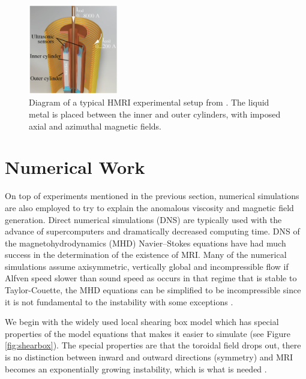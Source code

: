 \documentclass{jfm}
\begin{document}
\begin{figure}
    \centering
    \includegraphics[width=0.35\textwidth]{HMRI_diagram}
    \caption{Diagram of a typical HMRI experimental setup from \cite{Ji2010}. The liquid metal is placed between the inner and outer cylinders, with imposed axial and azimuthal magnetic fields.}
    \label{fig:diagram_hrmi}
\end{figure}



\section{Numerical Work}

On top of experiments mentioned in the previous section, numerical simulations
are also employed to try to explain the anomalous viscosity and magnetic field
generation. Direct numerical simulations (DNS) are typically used with the
advance of supercomputers and dramatically decreased computing time. DNS of the
magnetohydrodynamics (MHD) Navier--Stokes equations have had much success in the
determination of the existence of MRI. Many of the numerical simulations assume
axisymmetric, vertically global and incompressible flow if Alfven speed slower
than sound speed as occurs in that regime that is stable to Taylor-Couette, the
MHD equations can be simplified to be incompressible since it is not
fundamental to the instability \citep{Balbus1991} with some exceptions
\citep{Sano1998}. 

We begin with the widely used local shearing box model \citep{Balbus1991} which
has special properties of the model equations that makes it easier to simulate
(see Figure \ref{fig:shearbox}). The special properties are that the toroidal
field drops out, there is no distinction between inward and outward directions
(symmetry) and MRI becomes an exponentially growing instability, which is what
is needed \citep{Julien2010}. 
\end{document}

